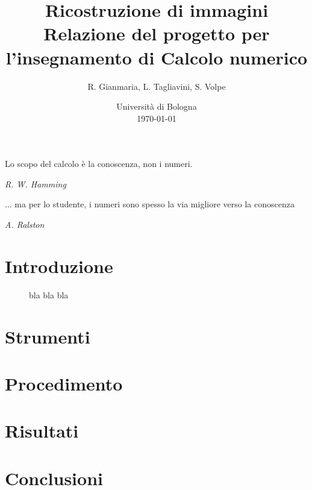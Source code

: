 \documentclass[a4paper]{article}
\title{Ricostruzione di immagini \\ \large Relazione del progetto per l'insegnamento di Calcolo numerico}
\author{
  R. Gianmaria,
  L. Tagliavini,
  S. Volpe
}
\date{
	Universit\`a di Bologna \\
  \today
}
\begin{document}
\maketitle
\thispagestyle{empty}

\epigraph{Lo scopo del calcolo è la conoscenza, non i numeri.}
{\textit{R. W. Hamming}}
\epigraph{... ma per lo studente, i numeri sono spesso la via migliore verso la
conoscenza}
{\textit{A. Ralston}}

\section{Introduzione}

 \begin{figure}
     \begin{center}
         \vspace*{-1.1in}
         \centerline{\scalebox{1.3}{}}
     \end{center}
     \vspace*{-0.2in}
     \caption{bla bla bla}
 \end{figure}

\section{Strumenti}

\section{Procedimento}


%

\section{Risultati}

\section{Conclusioni}
\end{document}
